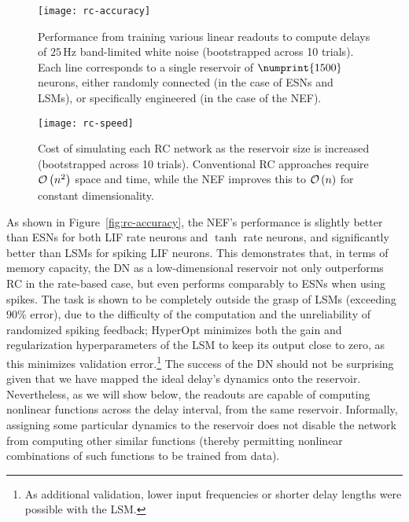 \begin{figure}
  \centering
  \texttt{[image: rc-accuracy]}
  \caption{ \label{fig:rc-accuracy}
  Performance from training various linear readouts to compute delays of $25$\,Hz band-limited white noise (bootstrapped across 10 trials).
  Each line corresponds to a single reservoir of $\numprint{1500}$ neurons, either randomly connected (in the case of ESNs and LSMs), or specifically engineered (in the case of the NEF).
  }

  \vspace{1em}

  \centering
  \texttt{[image: rc-speed]}
  \caption{ \label{fig:rc-speed}
  Cost of simulating each RC network as the reservoir size is increased (bootstrapped across 10 trials).
  Conventional RC approaches require $\mathcal{O}\left({ n^2 }\right)$ space and time, while the NEF improves this to $\mathcal{O}\left({ n }\right)$ for constant dimensionality.
  }
\end{figure}

As shown in Figure~\ref{fig:rc-accuracy}, the NEF's performance is slightly better than ESNs for both LIF rate neurons and $\tanh$ rate neurons, and significantly better than LSMs for spiking LIF neurons.
This demonstrates that, in terms of memory capacity, the DN as a low-dimensional reservoir not only outperforms RC in the rate-based case, but even performs comparably to ESNs when using spikes.
The task is shown to be completely outside the grasp of LSMs (exceeding $90$\% error), due to the difficulty of the computation and the unreliability of randomized spiking feedback; HyperOpt minimizes both the gain and regularization hyperparameters of the LSM to keep its output close to zero, as this minimizes validation error.\footnote{%
As additional validation, lower input frequencies or shorter delay lengths were possible with the LSM.}
The success of the DN should not be surprising given that we have mapped the ideal delay's dynamics onto the reservoir.
Nevertheless, as we will show below, the readouts are capable of computing nonlinear functions across the delay interval, from the same reservoir.
Informally, assigning some particular dynamics to the reservoir does not disable the network from computing other similar functions (thereby permitting nonlinear combinations of such functions to be trained from data).

